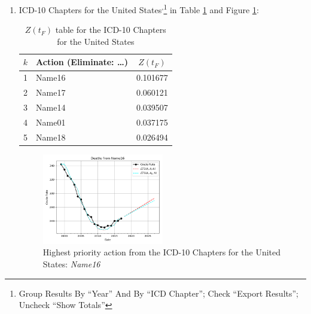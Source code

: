 \documentclass[10pt, a4paper, twocolumn]{IEEEconf}
\begin{document}
\begin{enumerate}
  \item ICD-10 Chapters for the United States\cite{centers2017underlying}\textsuperscript{,}\footnote{Group Results By \enquote{Year} And By \enquote{ICD Chapter}; Check \enquote{Export Results}; Uncheck \enquote{Show Totals}} in Table \ref{table:ztable5} and Figure \ref{fig:k5}:
    \begin{table}[H]
      \centering
      \begin{tabular}{clc}
        \toprule
          $k$ & Action (Eliminate: \ldots) & $Z(t_F)$ \\
        \midrule
          1   & Name16 & 0.101677 \\
          2   & Name17 & 0.060121 \\
          3   & Name14 & 0.039507 \\
          4   & Name01 & 0.037175 \\
          5   & Name18 & 0.026494 \\
        \bottomrule
      \end{tabular}
      \caption{$Z(t_F)$ table for the ICD-10 Chapters for the United States}
      \label{table:ztable5}
    \end{table}
    \begin{figure}[H]
      \centering
      \includegraphics[width=0.5\textwidth]{results/US_ICD10_CHAPTERS/Name16_ets.png}
      \caption{Highest priority action from the ICD-10 Chapters for the United States: \textit{Name16}}\label{fig:k5}
    \end{figure}
  

\end{enumerate}
\end{document}
